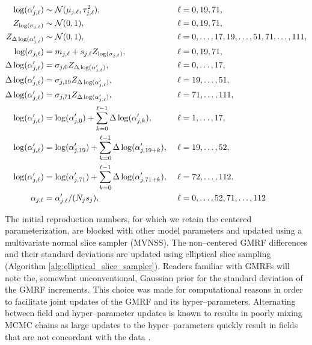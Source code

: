 \begin{footnotesize}
	\begin{align}
	\log(\alpha^\prime_{j,\ell}) &\sim \mcN(\mu_{j,\ell},\tau_{j,\ell}^2),&\ &\ell= 0,19,71, \nonumber\\
	Z_{\log(\sigma_{j,\ell})} &\sim \mcN(0,1),&\ &\ell=0,19,71, \nonumber \\
	Z_{\Delta\log(\alpha^\prime_{j,\ell})} &\sim \mcN(0,1),&\ &\ell=0,\dots,17,19,\dots,51,71,\dots,111, \nonumber \\ 
	\log(\sigma_{j,\ell}) &= m_{j,\ell} + s_{j,\ell}Z_{\log(\sigma_{j,\ell})},&\ &\ell = 0,19,71,\nonumber\\
	\Delta\log(\alpha^\prime_{j,\ell})&= \sigma_{j,0} Z_{\Delta\log(\alpha^\prime_{j,\ell})},&\ &\ell=0,\dots,17, \nonumber\\
	\Delta\log(\alpha^\prime_{j,\ell})&= \sigma_{j,19} Z_{\Delta\log(\alpha^\prime_{j,\ell})},&\ &\ell=19,\dots,51, \nonumber\\
	\Delta\log(\alpha^\prime_{j,\ell})&= \sigma_{j,71} Z_{\Delta\log(\alpha^\prime_{j,\ell})},&\ &\ell=71,\dots,111, \nonumber\\
	\log(\alpha^\prime_{j,\ell}) &= \log(\alpha^\prime_{j,0}) + \sum_{k=0}^{\ell-1}\Delta\log(\alpha^\prime_{j,k}),&\ &\ell = 1,\dots,17, \nonumber\\
	\log(\alpha^\prime_{j,\ell}) &= \log(\alpha^\prime_{j,19}) + \sum_{k=0}^{\ell-1}\Delta\log(\alpha^\prime_{j,19+k}),&\ &\ell = 19,\dots,52, \nonumber\\
	\log(\alpha^\prime_{j,\ell}) &= \log(\alpha^\prime_{j,71}) + \sum_{k=0}^{\ell-1}\Delta\log(\alpha^\prime_{j,71+k}),&\ &\ell = 72,\dots,112. \nonumber \\
	\alpha_{j,\ell} &= \alpha^\prime_{j,\ell}/(N_js_j),&\ &\ell=0,\dots,52,71,\dots,112 \nonumber
	\end{align}
\end{footnotesize}

The initial reproduction numbers, for which we retain the centered parameterization, are blocked with other model parameters and updated using a multivariate normal slice sampler (MVNSS). The non--centered GMRF differences and their standard deviations are updated 
using elliptical slice sampling (Algorithm \ref{alg:elliptical_slice_sampler}).
Readers familiar with GMRFs will note the, somewhat unconventional, Gaussian prior for the standard deviation of the GMRF increments. This choice was made for computational reasons in order to facilitate joint updates of the GMRF and its hyper--parameters. Alternating between field and hyper--parameter updates is known to results in poorly mixing MCMC chains as large updates to the hyper--parameters quickly result in fields that are not concordant with the data  \cite{knorr2002block,murray2010hyper}. 

